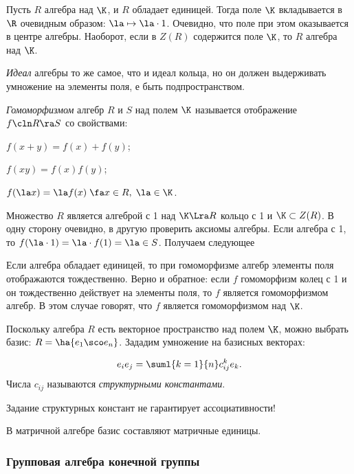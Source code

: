 \documentclass[a4paper]{article}
\begin{document}
Пусть $R$ алгебра над $\K$, и $R$ обладает единицей. Тогда поле $\K$ вкладывается в $\R$  очевидным
образом: $\la \mapsto \la \cdot 1$. Очевидно, что поле при этом оказывается в центре алгебры.
Наоборот, если в $Z(R)$ содержится поле $\K$, то $R$ алгебра над $\K$.

\begin{df}
\emph{Идеал} алгебры то же самое, что и идеал кольца, но он должен выдерживать умножение на  элементы
поля, е быть подпространством.
\end{df}

\begin{df}
\emph{Гомоморфизмом} алгебр $R$ и $S$ над полем $\K$ называется отображение $f\cln R \ra S$ со свойствами:

 $f(x+y)=f(x)+f(y)$;

 $f(xy)=f(x)f(y)$;

 $f(\la x)=\la f(x) \; \fa x \in R, \; \la \in \K$.
\end{df}

Множество $R$ является алгеброй с 1 над $\K \Lra R$ кольцо с 1 и $\K \subset Z(R)$. В одну  сторону
очевидно, в другую проверить аксиомы алгебры. Если алгебра с 1, то $f(\la \cdot 1) = \la \cdot
f(1) = \la \in S$. Получаем следующее

\begin{stm}
Если алгебра обладает единицей, то при гомоморфизме алгебр элементы поля отображаются тождественно.  Верно и
обратное: если $f$ гомоморфизм колец с 1 и он тождественно действует на элементы поля, то $f$ является
гомоморфизмом алгебр. В этом случае говорят, что $f$ является гомоморфизмом над $\K$.
\end{stm}

Поскольку алгебра $R$ есть векторное пространство над полем $\K$, можно выбрать базис: $R=\ha{e_1 \sco e_n}$.
Зададим умножение на базисных векторах:

$$e_i e_j = \suml{k=1}{n}c_{ij}^ke_k.$$
Числа $c_{ij}$ называются \emph{структурными константами}.

\begin{note}
Задание структурных констант не гарантирует ассоциативности!
\end{note}

\begin{ex}
В матричной алгебре базис составляют матричные единицы.
\end{ex}

\subsubsection{Групповая алгебра конечной группы}
\end{document}
